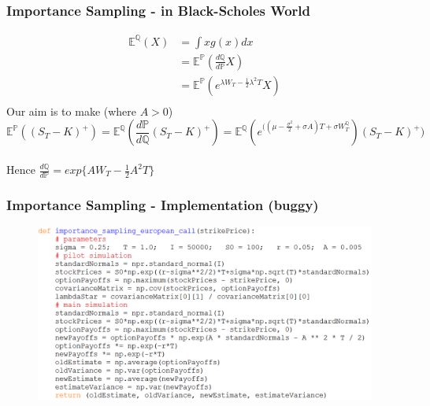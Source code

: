 \documentclass{beamer}
\begin{document}
\begin{frame}
\frametitle{Importance Sampling - in Black-Scholes World}
\begin{center}
\begin{equation*}
\begin{split}
\mathbb{E}^{\mathbb{Q}}(X) 
&= \int x g(x) dx\\
&= \mathbb{E}^{\mathbb{P}}(\frac{d\mathbb{Q}}{d\mathbb{P}}X) \\
&= \mathbb{E}^{\mathbb{P}}(e^{\lambda W_{T} - \frac{1}{2}\lambda^{2}T}X) \\[7mm]
\end{split}
\end{equation*}
Our aim is to make (where $A>0$)
$$\mathbb{E}^{\mathbb{P}}((S_{T} - K)^{+})= \mathbb{E}^{\mathbb{Q}}(\frac{d\mathbb{P}}{d\mathbb{Q}}(S_{T} - K)^{+}) = \mathbb{E}^{\mathbb{Q}}(e^{((\mu - \frac{\sigma^{2}}{2}+\sigma A)T + \sigma W_{T}^{\mathbb{Q}}})(S_{T} - K)^{+})$$\\[4mm]
Hence $\frac{d\mathbb{Q}}{d\mathbb{P}} = exp\{AW_{T} - \frac{1}{2}A^{2}T\}$
\end{center}
\end{frame}

\begin{frame}
\frametitle{Importance Sampling - Implementation (buggy)}
\begin{figure}[H]
	\includegraphics[scale=0.42]{importance_sampling_european_call.png}
\end{figure}
\end{frame}
\end{document}
